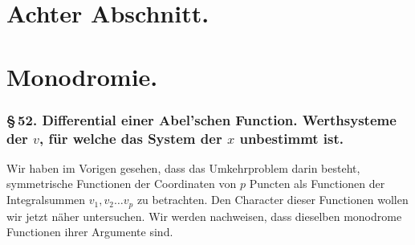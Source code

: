 \documentclass[10pt]{article}
\begin{document}
\section*{Achter Abschnitt.}
\section*{Monodromie.}

\subsubsection*{\S\,52. Differential einer Abel'schen Function. Werthsysteme der \(v\), für welche das System der \(x\) unbestimmt ist.}

Wir haben im Vorigen gesehen, dass das Umkehrproblem darin besteht, symmetrische Functionen der Coordinaten von \(p\) Puncten als Functionen der Integralsummen \(v_1,v_2\ldots v_p\) zu betrachten. Den Character dieser Functionen wollen wir jetzt näher untersuchen. Wir werden nachweisen, dass dieselben monodrome Functionen ihrer Argumente sind.
\end{document}
